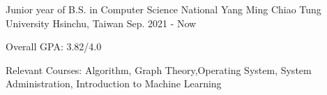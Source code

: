 

\begin{cventries}

  \cventry
    {Junior year of B.S. in Computer Science} %
    {National Yang Ming Chiao Tung University} %
    {Hsinchu, Taiwan} %
    {Sep. 2021 - Now} %
    {
      \begin{cvitems} %
        \item {Overall GPA: 3.82/4.0}
        \item {Relevant Courses: Algorithm, Graph Theory,Operating System, System Administration, Introduction to Machine Learning}
      \end{cvitems}
    }

\end{cventries}
